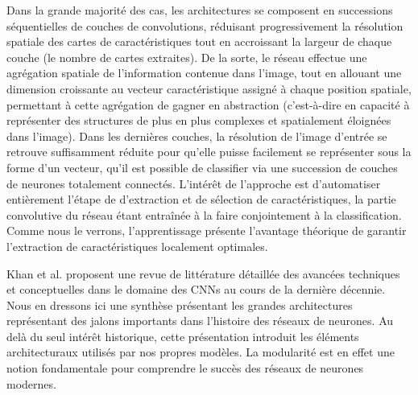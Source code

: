  Dans la grande majorité des cas, les architectures se composent en successions séquentielles de couches de convolutions, réduisant progressivement la résolution spatiale des cartes de caractéristiques tout en accroissant la largeur de chaque couche (le nombre de cartes extraites). De la sorte, le réseau effectue une agrégation spatiale de l'information contenue dans l'image, tout en allouant une dimension croissante au vecteur caractéristique assigné à chaque position spatiale, permettant à cette agrégation de gagner en abstraction (c'est-à-dire en capacité à représenter des structures de plus en plus complexes et spatialement éloignées dans l'image). 
 Dans les dernières couches, la résolution de l'image d'entrée se retrouve suffisamment réduite pour qu'elle puisse facilement se représenter sous la forme d'un vecteur, qu'il est possible de classifier via une succession de couches de neurones totalement connectés. L'intérêt de l'approche est d'automatiser entièrement l'étape de d'extraction et de sélection de caractéristiques, la partie convolutive du réseau étant entraînée à la faire conjointement à la classification. Comme nous le verrons, l'apprentissage présente l'avantage théorique de garantir l'extraction de caractéristiques localement optimales.

Khan et al. \cite{khanSurveyRecentArchitectures2020} proposent une revue de littérature détaillée des avancées techniques et conceptuelles dans le domaine des \ac{CNN}s au cours  de la dernière décennie. Nous en dressons ici une synthèse présentant les grandes architectures représentant des jalons importants dans l'histoire des réseaux de neurones. Au delà du seul intérêt historique, cette présentation introduit les éléments architecturaux utilisés par nos propres modèles. La modularité est en effet une notion fondamentale pour comprendre le succès des réseaux de neurones modernes.

